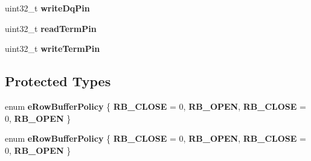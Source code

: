 \begin{DoxyCompactItemize}
\item 
\hypertarget{classMemParam_ab3cfad2f314729e214a28f295266e380}{uint32\-\_\-t {\bfseries write\-Dq\-Pin}}\label{classMemParam_ab3cfad2f314729e214a28f295266e380}

\item 
\hypertarget{classMemParam_adc50244312a52ec3b3f344abfacfb498}{uint32\-\_\-t {\bfseries read\-Term\-Pin}}\label{classMemParam_adc50244312a52ec3b3f344abfacfb498}

\item 
\hypertarget{classMemParam_a8d27096c16504516e3813ae36faaef88}{uint32\-\_\-t {\bfseries write\-Term\-Pin}}\label{classMemParam_a8d27096c16504516e3813ae36faaef88}

\end{DoxyCompactItemize}
\subsection*{Protected Types}
\begin{DoxyCompactItemize}
\item 
enum {\bfseries e\-Row\-Buffer\-Policy} \{ {\bfseries R\-B\-\_\-\-C\-L\-O\-S\-E} = 0, 
{\bfseries R\-B\-\_\-\-O\-P\-E\-N}, 
{\bfseries R\-B\-\_\-\-C\-L\-O\-S\-E} = 0, 
{\bfseries R\-B\-\_\-\-O\-P\-E\-N}
 \}
\item 
enum {\bfseries e\-Row\-Buffer\-Policy} \{ {\bfseries R\-B\-\_\-\-C\-L\-O\-S\-E} = 0, 
{\bfseries R\-B\-\_\-\-O\-P\-E\-N}, 
{\bfseries R\-B\-\_\-\-C\-L\-O\-S\-E} = 0, 
{\bfseries R\-B\-\_\-\-O\-P\-E\-N}
 \}
\end{DoxyCompactItemize}
